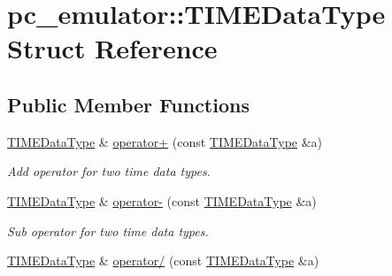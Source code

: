 \hypertarget{structpc__emulator_1_1TIMEDataType}{}\section{pc\+\_\+emulator\+:\+:T\+I\+M\+E\+Data\+Type Struct Reference}
\label{structpc__emulator_1_1TIMEDataType}
\subsection*{Public Member Functions}
\begin{DoxyCompactItemize}
\item 
\hyperlink{structpc__emulator_1_1TIMEDataType}{T\+I\+M\+E\+Data\+Type} \& \hyperlink{structpc__emulator_1_1TIMEDataType_aeb3513a3c6a7bf66113df92f31c32dd4}{operator+} (const \hyperlink{structpc__emulator_1_1TIMEDataType}{T\+I\+M\+E\+Data\+Type} \&a)\hypertarget{structpc__emulator_1_1TIMEDataType_aeb3513a3c6a7bf66113df92f31c32dd4}{}\label{structpc__emulator_1_1TIMEDataType_aeb3513a3c6a7bf66113df92f31c32dd4}

\begin{DoxyCompactList}\small\item\em Add operator for two time data types. \end{DoxyCompactList}\item 
\hyperlink{structpc__emulator_1_1TIMEDataType}{T\+I\+M\+E\+Data\+Type} \& \hyperlink{structpc__emulator_1_1TIMEDataType_a5bd5db12623cc30d096b6d3cc6d78560}{operator-\/} (const \hyperlink{structpc__emulator_1_1TIMEDataType}{T\+I\+M\+E\+Data\+Type} \&a)\hypertarget{structpc__emulator_1_1TIMEDataType_a5bd5db12623cc30d096b6d3cc6d78560}{}\label{structpc__emulator_1_1TIMEDataType_a5bd5db12623cc30d096b6d3cc6d78560}

\begin{DoxyCompactList}\small\item\em Sub operator for two time data types. \end{DoxyCompactList}\item 
\hyperlink{structpc__emulator_1_1TIMEDataType}{T\+I\+M\+E\+Data\+Type} \& \hyperlink{structpc__emulator_1_1TIMEDataType_a12c03eb7dfcf5e9f7ed0eb8d81eee04f}{operator/} (const \hyperlink{structpc__emulator_1_1TIMEDataType}{T\+I\+M\+E\+Data\+Type} \&a)\hypertarget{structpc__emulator_1_1TIMEDataType_a12c03eb7dfcf5e9f7ed0eb8d81eee04f}{}\label{structpc__emulator_1_1TIMEDataType_a12c03eb7dfcf5e9f7ed0eb8d81eee04f}


\end{DoxyCompactItemize}
